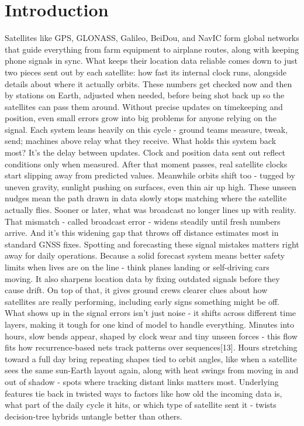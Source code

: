 \documentclass[conference]{IEEEtran}
\begin{document}
\section{Introduction}
Satellites like GPS, GLONASS, Galileo, BeiDou, and NavIC form global networks that guide everything from farm equipment to airplane routes, along with keeping phone signals in sync. What keeps their location data reliable comes down to just two pieces sent out by each satellite: how fast its internal clock runs, alongside details about where it actually orbits. These numbers get checked now and then by stations on Earth, adjusted when needed, before being shot back up so the satellites can pass them around. Without precise updates on timekeeping and position, even small errors grow into big problems for anyone relying on the signal. Each system leans heavily on this cycle - ground teams measure, tweak, send; machines above relay what they receive.
What holds this system back most? It's the delay between updates. Clock and position data sent out reflect conditions only when measured. After that moment passes, real satellite clocks start slipping away from predicted values. Meanwhile orbits shift too - tugged by uneven gravity, sunlight pushing on surfaces, even thin air up high. These unseen nudges mean the path drawn in data slowly stops matching where the satellite actually flies. Sooner or later, what was broadcast no longer lines up with reality. That mismatch - called broadcast error - widens steadily until fresh numbers arrive. And it’s this widening gap that throws off distance estimates most in standard GNSS fixes.
Spotting and forecasting these signal mistakes matters right away for daily operations. Because a solid forecast system means better safety limits when lives are on the line - think planes landing or self-driving cars moving. It also sharpens location data by fixing outdated signals before they cause drift. On top of that, it gives ground crews clearer clues about how satellites are really performing, including early signs something might be off.
What shows up in the signal errors isn’t just noise - it shifts across different time layers, making it tough for one kind of model to handle everything. Minutes into hours, slow bends appear, shaped by clock wear and tiny unseen forces - this flow fits how recurrence-based nets track patterns over sequences[13]. Hours stretching toward a full day bring repeating shapes tied to orbit angles, like when a satellite sees the same sun-Earth layout again, along with heat swings from moving in and out of shadow - spots where tracking distant links matters most. Underlying features tie back in twisted ways to factors like how old the incoming data is, what part of the daily cycle it hits, or which type of satellite sent it - twists decision-tree hybrids untangle better than others.
\end{document}
